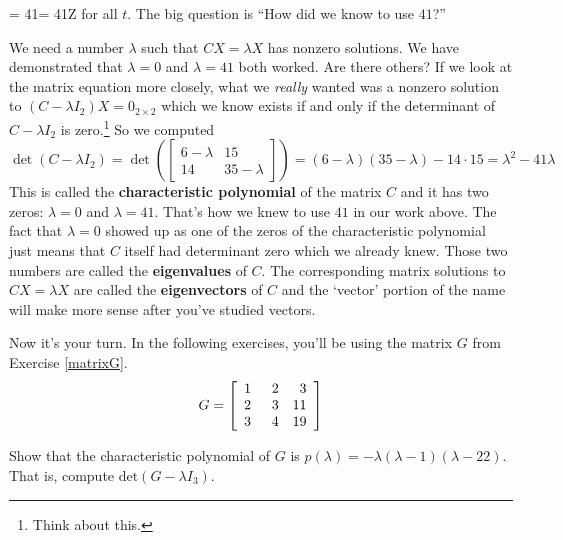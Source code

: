 \documentclass{ximera}
\begin{document}
\begin{question}
= 41 = 41Z\] for all $t$.  The big question is ``How did we know to use $41$?'' 

 

We need a number $\lambda$ such that $CX = \lambda X$ has nonzero solutions.  We have demonstrated that $\lambda = 0$ and $\lambda = 41$ both worked.  Are there others?  If we look at the matrix equation more closely, what we \emph{really} wanted was a nonzero solution to $(C - \lambda I_2)X = 0_{2 \times 2}$ which we know exists if and only if the determinant of $C - \lambda I_2$ is zero.\footnote{Think about this.}  So we computed \[\det(C - \lambda I_2) = \det\left(\left[ \begin{array}{rr} 6 - \lambda & 15 \\ 14 & 35 - \lambda \end{array} \right] \right) = (6 - \lambda)(35 - \lambda) - 14 \cdot 15 = \lambda^{2} - 41 \lambda\]  This is called the {\bf characteristic polynomial}   of the matrix $C$ and it has two zeros: $\lambda = 0$ and $\lambda = 41$.  That's how we knew to use $41$ in our work above.  The fact that $\lambda = 0$ showed up as one of the zeros of the characteristic polynomial just means that $C$ itself had determinant zero which we already knew.  Those two numbers are called the {\bf eigenvalues} of $C$.  The corresponding matrix solutions to $CX = \lambda X$ are called the {\bf eigenvectors} of $C$ and the `vector' portion of the name will make more sense after you've studied vectors.  

 

Now it's your turn. In the following exercises, you'll be using the matrix $G$ from Exercise \ref{matrixG}.\[G = \left[ \begin{array}{rrr} 1 & \hphantom{1}2 & 3 \\ 2 & 3 & 11 \\ 3 & 4 & 19 \end{array} \right]\] 

\begin{problem}\label{eigenfirst}
Show that the characteristic polynomial of $G$ is $p(\lambda) = -\lambda(\lambda - 1)(\lambda - 22)$.  That is, compute $\text{det}\left(G - \lambda I_3\right)$.
\end{problem}


\end{question}
\end{document}
